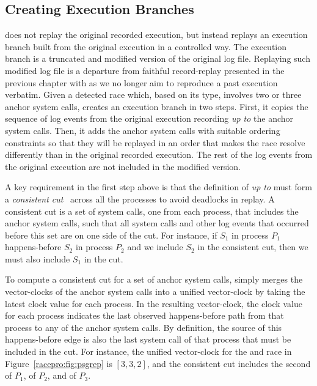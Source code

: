\subsection{Creating Execution Branches}  \label{racepro:sec:branches}

\racepro does not replay the original recorded execution, but
instead replays an execution branch built from the original execution
in a controlled way. The execution branch is a truncated and modified version of
the original log file. Replaying such modified log file is a departure from
faithful record-replay presented in the previous chapter with
\scribe as we no longer aim to reproduce a past execution verbatim.
Given a detected race which, based
on its type, involves two or three anchor system calls, \racepro creates an
execution branch in two steps.  First, it copies the sequence of
log events from the original execution recording \emph{up to} the anchor
system calls.  Then, it adds the anchor system calls with suitable
ordering constraints so that they will be replayed in an order that makes
the race resolve differently than in the original recorded execution.
The rest of the log events from the original execution are not
included in the modified version.

A key requirement in the first step above is that the definition of
\emph{up to} must form a \emph{consistent cut}~\cite{vectorclock}
across all the processes to avoid deadlocks in replay.  A consistent
cut is a set of system calls, one from each process, that includes the
anchor system calls, such that all system calls and other log events
that occurred before this set are on one side of the cut.  For
instance, if $S_1$ in process $P_1$ happens-before $S_2$ in process
$P_2$ and we include $S_2$ in the consistent cut, then we must also
include $S_1$ in the cut.

To compute a consistent cut for a set of anchor system calls,
\racepro simply merges the vector-clocks of the anchor system calls into
a unified vector-clock by taking the latest clock value for each
process.  In the resulting vector-clock, the clock value for each
process indicates the last observed happens-before path from that process
to any of the anchor system calls.  By definition, the source of this
happens-before edge is also the last system call of that process that must
be included in the cut.  For instance, the unified vector-clock for the
 and 
race in Figure~\ref{racepro:fig:psgrep} is $[3,3,2]$, and the consistent cut
includes the second  of $P_1$,  of $P_2$, and
 of $P_3$.

